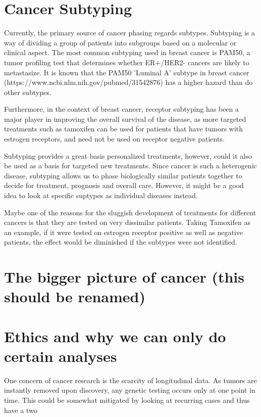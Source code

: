 \documentclass{kththesis}
\begin{document}
    \section{Cancer Subtyping}
    Currently, the primary source of cancer phasing regards subtypes. Subtyping is a way of dividing a group of patients into subgroups based on a molecular or clinical aspect. The most common subtyping used in breast cancer is PAM50, a tumor profiling test that determines whether ER+/HER2- cancers are likely to metastasize. It is known that the PAM50 'Luminal A' subtype in breast cancer (https://www.ncbi.nlm.nih.gov/pubmed/31542876) has a higher hazard than do other subtypes.

    Furthermore, in the context of breast cancer, receptor subtyping has been a major player in improving the overall survival of the disease, as more targeted treatments such as tamoxifen can be used for patients that have tumors with estrogen receptors, and need not be used on receptor negative patients.

    Subtyping provides a great basis personalized treatments, however, could it also be used as a basis for targeted new treatments. Since cancer is such a heterogenic disease, subtyping allows us to phase biologically similar patients together to decide for treatment, prognosis and overall care. However, it might be a good idea to look at specific suptypes as individual diseases instead.

    Maybe one of the reasons for the sluggish development of treatments for different cancers is that they are tested on very dissimilar patients. Taking Tamoxifen as an example, if it were tested on estrogen receptor positive as well as negative patients, the effect would be diminished if the subtypes were not identified.

    \section{The bigger picture of cancer (this should be renamed)}


    \section{Ethics and why we can only do certain analyses}
    One concern of cancer research is the scarcity of longitudinal data. As tumors are instantly removed upon discovery, any genetic testing occurs only at one point in time. This could be somewhat mitigated by looking at recurring cases and thus have a two
\end{document}
